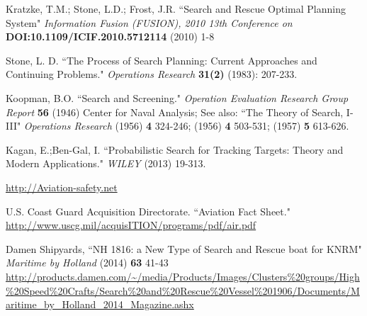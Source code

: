 \documentclass[12pt, letterpaper]{article}  %
\theoremstyle{definition}
\theoremstyle{remark}
\theoremstyle{plain}
\begin{document}
\begin{thebibliography}{99}





 Kratzke, T.M.; Stone, L.D.; Frost, J.R. ``Search and Rescue Optimal Planning System" \emph{Information Fusion (FUSION), 2010 13th Conference on} \textbf{DOI:10.1109/ICIF.2010.5712114} 
(2010) 1-8 

  Stone, L. D.  ``The Process of Search Planning: Current Approaches and Continuing Problems."  \emph{Operations Research} \textbf{31(2)} (1983): 207-233.

  Koopman, B.O.  ``Search and Screening."  \emph{Operation Evaluation Research Group Report} \textbf{56} (1946) Center for Naval Analysis; See also: ``The Theory of Search, I-III" \emph{Operations Research} (1956) \textbf{4} 324-246; (1956) \textbf{4} 503-531;  (1957) \textbf{5} 613-626. 

  Kagan, E.;Ben-Gal, I.  ``Probabilistic Search for Tracking Targets: Theory and Modern Applications."  \emph{WILEY} (2013) 19-313.


 \url{http://Aviation-safety.net}

 U.S. Coast Guard Acquisition Directorate. ``Aviation Fact Sheet." \url{http://www.uscg.mil/acquisITION/programs/pdf/air.pdf}

 Damen Shipyards, ``NH 1816: a New Type of Search and Rescue boat for KNRM" \emph{Maritime by Holland} (2014) \textbf{63} 41-43
\url{http://products.damen.com/~/media/Products/Images/Clusters\%20groups/High\%20Speed\%20Crafts/Search\%20and\%20Rescue\%20Vessel\%201906/Documents/Maritime_by_Holland_2014_Magazine.ashx}

\end{thebibliography}

\end{document}
